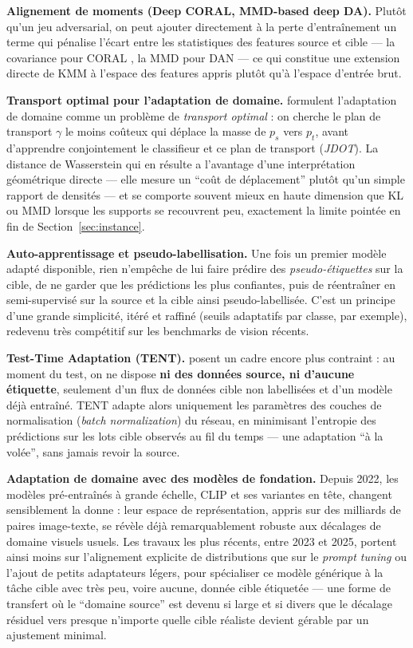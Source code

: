 \documentclass[11pt]{article}
\begin{document}
\begin{recent}
\textbf{Alignement de moments (Deep CORAL, MMD-based deep DA).} Plutôt qu'un jeu adversarial, on peut
ajouter directement à la perte d'entraînement un terme qui pénalise l'écart entre les statistiques des
features source et cible --- la covariance pour CORAL \citep{sun2016coral}, la MMD pour DAN
\citep{long2015dan} --- ce qui constitue une extension directe de KMM à l'espace des features appris
plutôt qu'à l'espace d'entrée brut.

\textbf{Transport optimal pour l'adaptation de domaine.} \citet{courty2017optimal} formulent
l'adaptation de domaine comme un problème de \emph{transport optimal} : on cherche le plan de transport
$\gamma$ le moins coûteux qui déplace la masse de $p_s$ vers $p_t$, avant d'apprendre conjointement le
classifieur et ce plan de transport (\emph{JDOT}). La distance de Wasserstein qui en résulte a
l'avantage d'une interprétation géométrique directe --- elle mesure un \enquote{coût de déplacement}
plutôt qu'un simple rapport de densités --- et se comporte souvent mieux en haute dimension que KL ou
MMD lorsque les supports se recouvrent peu, exactement la limite pointée en fin de
Section~\ref{sec:instance}.

\textbf{Auto-apprentissage et pseudo-labellisation.} Une fois un premier modèle adapté disponible, rien
n'empêche de lui faire prédire des \emph{pseudo-étiquettes} sur la cible, de ne garder que les
prédictions les plus confiantes, puis de réentraîner en semi-supervisé sur la source et la cible ainsi
pseudo-labellisée. C'est un principe d'une grande simplicité, itéré et raffiné (seuils adaptatifs par
classe, par exemple), redevenu très compétitif sur les benchmarks de vision récents.

\textbf{Test-Time Adaptation (TENT).} \citet{wang2021tent} posent un cadre encore plus contraint : au
moment du test, on ne dispose \textbf{ni des données source, ni d'aucune étiquette}, seulement d'un flux
de données cible non labellisées et d'un modèle déjà entraîné. TENT adapte alors uniquement les
paramètres des couches de normalisation (\emph{batch normalization}) du réseau, en minimisant l'entropie
des prédictions sur les lots cible observés au fil du temps --- une adaptation \enquote{à la volée}, sans
jamais revoir la source.

\textbf{Adaptation de domaine avec des modèles de fondation.} Depuis 2022, les modèles pré-entraînés à
grande échelle, CLIP et ses variantes en tête, changent sensiblement la donne : leur espace de
représentation, appris sur des milliards de paires image-texte, se révèle déjà remarquablement robuste
aux décalages de domaine visuels usuels. Les travaux les plus récents, entre 2023 et 2025, portent ainsi
moins sur l'alignement explicite de distributions que sur le \emph{prompt tuning} ou l'ajout de petits
adaptateurs légers, pour spécialiser ce modèle générique à la tâche cible avec très peu, voire aucune,
donnée cible étiquetée --- une forme de transfert où le \enquote{domaine source} est devenu si large et
si divers que le décalage résiduel vers presque n'importe quelle cible réaliste devient gérable par un
ajustement minimal.
\end{recent}
\end{document}

